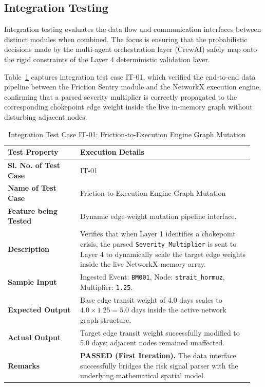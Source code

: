 \subsection{Integration Testing}
Integration testing evaluates the data flow and communication interfaces between distinct modules when combined. The focus is ensuring that the probabilistic decisions made by the multi-agent orchestration layer (CrewAI) safely map onto the rigid constraints of the Layer 4 deterministic validation layer.

Table~\ref{tab:it01} captures integration test case IT-01, which verified the end-to-end data pipeline between the Friction Sentry module and the NetworkX execution engine, confirming that a parsed severity multiplier is correctly propagated to the corresponding chokepoint edge weight inside the live in-memory graph without disturbing adjacent nodes.

\begin{table}[H]
    \centering
    \caption{Integration Test Case IT-01: Friction-to-Execution Engine Graph Mutation}
    \label{tab:it01}
    \begin{tabular}{|p{0.28\linewidth}|p{0.67\linewidth}|}
        \hline
        \textbf{Test Property} & \textbf{Execution Details} \\ \hline
        \textbf{Sl. No. of Test Case} & IT-01 \\ \hline
        \textbf{Name of Test Case} & Friction-to-Execution Engine Graph Mutation \\ \hline
        \textbf{Feature being Tested} & Dynamic edge-weight mutation pipeline interface. \\ \hline
        \textbf{Description} & Verifies that when Layer 1 identifies a chokepoint crisis, the parsed \texttt{Severity\_Multiplier} is sent to Layer 4 to dynamically scale the target edge weights inside the live NetworkX memory array. \\ \hline
        \textbf{Sample Input} & Ingested Event: \texttt{BM001}, Node: \texttt{strait\_hormuz}, Multiplier: \texttt{1.25}. \\ \hline
        \textbf{Expected Output} & Base edge transit weight of 4.0 days scales to $4.0 \times 1.25 = 5.0$ days inside the active network graph structure. \\ \hline
        \textbf{Actual Output} & Target edge transit weight successfully modified to 5.0 days; adjacent nodes remained unaffected. \\ \hline
        \textbf{Remarks} & \textbf{PASSED (First Iteration).} The data interface successfully bridges the risk signal parser with the underlying mathematical spatial model. \\ \hline
    \end{tabular}
\end{table}

